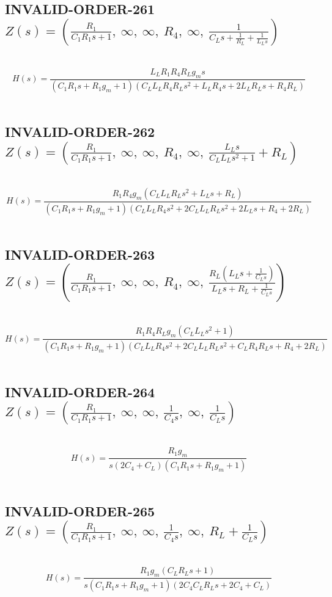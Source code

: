 \documentclass{article}
\begin{document}
\subsection{INVALID-ORDER-261 $Z(s) = \left( \frac{R_{1}}{C_{1} R_{1} s + 1}, \  \infty, \  \infty, \  R_{4}, \  \infty, \  \frac{1}{C_{L} s + \frac{1}{R_{L}} + \frac{1}{L_{L} s}}\right)$ } \ 
\textbf{\[H(s) = \frac{L_{L} R_{1} R_{4} R_{L} g_{m} s}{\left(C_{1} R_{1} s + R_{1} g_{m} + 1\right) \left(C_{L} L_{L} R_{4} R_{L} s^{2} + L_{L} R_{4} s + 2 L_{L} R_{L} s + R_{4} R_{L}\right)}\] } \ 
\subsection{INVALID-ORDER-262 $Z(s) = \left( \frac{R_{1}}{C_{1} R_{1} s + 1}, \  \infty, \  \infty, \  R_{4}, \  \infty, \  \frac{L_{L} s}{C_{L} L_{L} s^{2} + 1} + R_{L}\right)$ } \ 
\textbf{\[H(s) = \frac{R_{1} R_{4} g_{m} \left(C_{L} L_{L} R_{L} s^{2} + L_{L} s + R_{L}\right)}{\left(C_{1} R_{1} s + R_{1} g_{m} + 1\right) \left(C_{L} L_{L} R_{4} s^{2} + 2 C_{L} L_{L} R_{L} s^{2} + 2 L_{L} s + R_{4} + 2 R_{L}\right)}\] } \ 
\subsection{INVALID-ORDER-263 $Z(s) = \left( \frac{R_{1}}{C_{1} R_{1} s + 1}, \  \infty, \  \infty, \  R_{4}, \  \infty, \  \frac{R_{L} \left(L_{L} s + \frac{1}{C_{L} s}\right)}{L_{L} s + R_{L} + \frac{1}{C_{L} s}}\right)$ } \ 
\textbf{\[H(s) = \frac{R_{1} R_{4} R_{L} g_{m} \left(C_{L} L_{L} s^{2} + 1\right)}{\left(C_{1} R_{1} s + R_{1} g_{m} + 1\right) \left(C_{L} L_{L} R_{4} s^{2} + 2 C_{L} L_{L} R_{L} s^{2} + C_{L} R_{4} R_{L} s + R_{4} + 2 R_{L}\right)}\] } \ 
\subsection{INVALID-ORDER-264 $Z(s) = \left( \frac{R_{1}}{C_{1} R_{1} s + 1}, \  \infty, \  \infty, \  \frac{1}{C_{4} s}, \  \infty, \  \frac{1}{C_{L} s}\right)$ } \ 
\textbf{\[H(s) = \frac{R_{1} g_{m}}{s \left(2 C_{4} + C_{L}\right) \left(C_{1} R_{1} s + R_{1} g_{m} + 1\right)}\] } \ 
\subsection{INVALID-ORDER-265 $Z(s) = \left( \frac{R_{1}}{C_{1} R_{1} s + 1}, \  \infty, \  \infty, \  \frac{1}{C_{4} s}, \  \infty, \  R_{L} + \frac{1}{C_{L} s}\right)$ } \ 
\textbf{\[H(s) = \frac{R_{1} g_{m} \left(C_{L} R_{L} s + 1\right)}{s \left(C_{1} R_{1} s + R_{1} g_{m} + 1\right) \left(2 C_{4} C_{L} R_{L} s + 2 C_{4} + C_{L}\right)}\] } \ 
\end{document}
